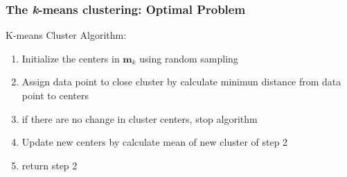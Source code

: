 \documentclass{beamer}
\begin{document}
\begin{frame}
\frametitle{The {\it k}-means clustering: Optimal Problem}
K-means Cluster Algorithm:
\begin{enumerate}
\item Initialize the centers in $\mathbf{m}_k$ using random sampling
\item Assign data point to close cluster by calculate minimun distance from data point to centers
\item if there are no change in cluster centers, stop algorithm
\item Update new centers by calculate mean of new cluster of step 2
\item return step 2
\end{enumerate}
\end{frame}
\end{document}
